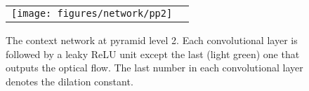 \documentclass[10pt,journal,cspaper,compsoc]{IEEEtran}
\begin{document}
\begin{figure}
	\begin{center}
		\newcommand{\shiftfigure}{\hspace{5mm}}
		\begin{tabular}{cc}
			\texttt{[image: figures/network/pp2]} 
		\end{tabular}
	\end{center}
	\vspace{-4mm}
	\caption{The context network at pyramid level 2. Each convolutional layer is followed by a leaky ReLU unit except the last (light green) one that outputs the optical flow. The last number in each convolutional layer denotes the dilation constant. }
	\label{fig:network:pp}
\end{figure}
\end{document}
